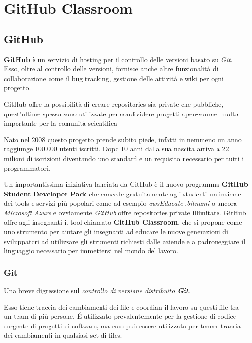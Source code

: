 
\chapter{GitHub Classroom}
	\section{GitHub}
		\textbf{GitHub} è un servizio di hosting per il controllo delle versioni basato su \textit{Git}.
		Esso, oltre al controllo delle versioni, fornisce anche altre funzionalità di collaborazione come il bug tracking, gestione delle attività e wiki per ogni progetto.
		
		GitHub offre la possibilità di creare repositories sia private che pubbliche, quest'ultime spesso sono utilizzate per condividere progetti open-source, molto importante per la comunità scientifica.
		
		Nato nel 2008 questo progetto prende subito piede, infatti in nemmeno un anno raggiunge 100.000 utenti iscritti. Dopo 10 anni dalla sua nascita arriva a 22 milioni di iscrizioni diventando uno standard  e un requisito necessario per tutti i programmatori.
		
		Un importantissima iniziativa lanciata da GitHub è il nuovo programma \textbf{GitHub Student Developer Pack} che concede gratuitamente agli studenti un insieme dei tools e servizi più popolari come ad esempio \textit{awsEducate} ,\textit{bitnami} o ancora \textit{Microsoft Azure} e ovviamente \textit{GitHub} offre repositories private illimitate.
		GitHub offre agli insegnanti il tool chiamato \textbf{GitHub Classroom}, che si propone come uno strumento per aiutare gli insegnanti ad  educare le nuove generazioni di sviluppatori ad utilizzare gli strumenti richiesti dalle aziende e a padroneggiare il linguaggio necessario per immettersi nel mondo del lavoro.
	
		\subsection{Git}
			Una breve digressione sul \textit{controllo di versione distribuito \textbf{Git}}.
			
			Esso tiene traccia dei cambiamenti dei file e coordian il lavoro su questi file tra un team di più persone.
			\'E utilizzato prevalentemente per la gestione di codice sorgente di progetti di software, ma esso può essere utilizzato per tenere traccia dei cambiamenti in  qualsiasi set di files.
			
